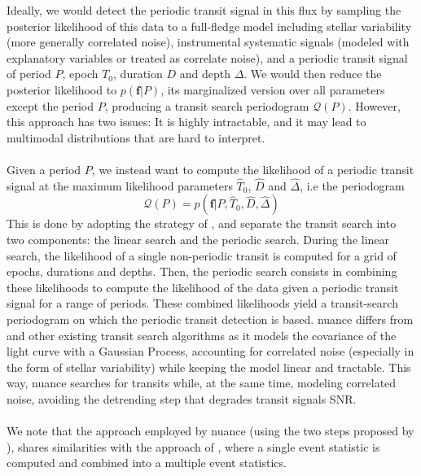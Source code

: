 \documentclass{aastex631}
\begin{document}
Ideally, we would detect the periodic transit signal in this flux by sampling the posterior likelihood of this data to a full-fledge model including stellar variability (more generally correlated noise), instrumental systematic signals (modeled with explanatory variables or treated as correlate noise), and a periodic transit signal of period $P$, epoch $T_0$, duration $D$ and depth $\Delta$. We would then reduce the posterior likelihood to $p(\bm{f}\vert P)$, its marginalized version over all parameters except the period $P$, producing a transit search periodogram $\mathcal{Q}(P)$. However, this approach has two issues: It is highly intractable, and it may lead to multimodal distributions that are hard to interpret.
\\\\
Given a period $P$, we instead want to compute the likelihood of a periodic transit signal at the maximum likelihood parameters $\hat T_0$, $\hat D$ and $\hat \Delta$, i.e the periodogram
\begin{equation}\label{eq:periodogram}
        \mathcal{Q}(P) = p(\bm{f} \vert P, \hat T_0 ,\hat D, \hat \Delta)
\end{equation}
This is done by adopting the strategy of \cite{foreman2016}, and separate the transit search into two components: the linear search and the periodic search. During the linear search, the likelihood of a single non-periodic transit is computed for a grid of epochs, durations and depths. Then, the periodic search consists in combining these likelihoods to compute the likelihood of the data given a periodic transit signal for a range of periods. These combined likelihoods yield a transit-search periodogram on which the periodic transit detection is based. \textsf{nuance} differs from \cite{foreman2016} and other existing transit search algorithms as it models the covariance of the light curve with a Gaussian Process, accounting for correlated noise (especially in the form of stellar variability) while keeping the model linear and tractable. This way, \textsf{nuance} searches for transits while, at the same time, modeling correlated noise, avoiding the detrending step that degrades transit signals SNR.\\\\
We note that the approach employed by \textsf{nuance} (using the two steps proposed by \citealt{foreman2016}), shares similarities with the approach of \cite{Jenkins2010}, where a single event statistic is computed and combined into a multiple event statistics.
\end{document}
